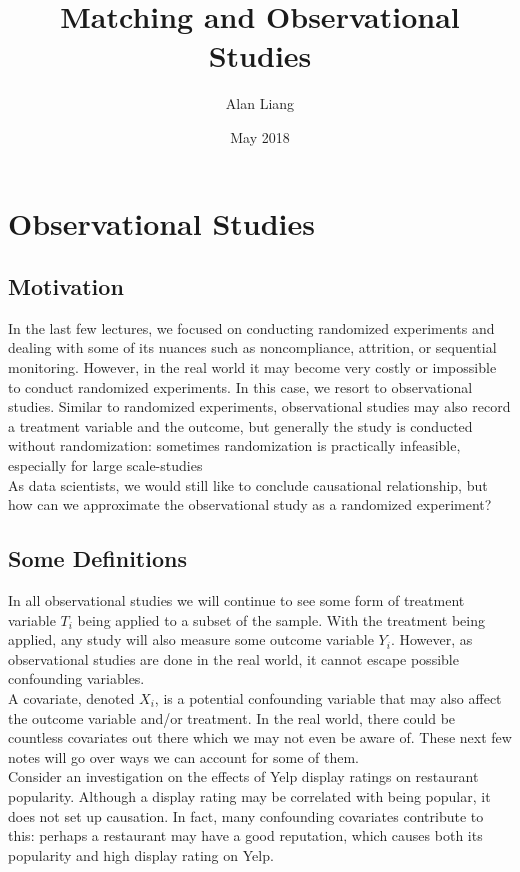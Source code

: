 \documentclass{article}
\title{Matching and Observational Studies}
\author{Alan Liang}
\date{May 2018}
\begin{document}
\maketitle
\section{Observational Studies}
\subsection{Motivation}
In the last few lectures, we focused on conducting randomized experiments and dealing with some of its nuances such as noncompliance, attrition, or sequential monitoring.
However, in the real world it may become very costly or impossible to conduct randomized experiments.
In this case, we resort to observational studies.
Similar to randomized experiments, observational studies may also record a treatment variable and the outcome, but generally the study is conducted without randomization: sometimes randomization is practically infeasible, especially for large scale-studies 
\\
As data scientists, we would still like to conclude causational relationship, but how can we approximate the observational study as a randomized experiment?

\subsection{Some Definitions}
In all observational studies we will continue to see some form of treatment variable $T_i$ being applied to a subset of the sample.
With the treatment being applied, any study will also measure some outcome variable $Y_i$. 
However, as observational studies are done in the real world, it cannot escape possible confounding variables.
\\
A covariate, denoted $X_i$, is a potential confounding variable that may also affect the outcome variable and/or treatment.
In the real world, there could be countless covariates out there which we may not even be aware of. 
These next few notes will go over ways we can account for some of them.
\\
Consider an investigation on the effects of Yelp display ratings on restaurant popularity. 
Although a display rating may be correlated with being popular, it does not set up causation. 
In fact, many confounding covariates contribute to this: perhaps a restaurant may have a good reputation, which causes both its popularity and high display rating on Yelp.
\end{document}
